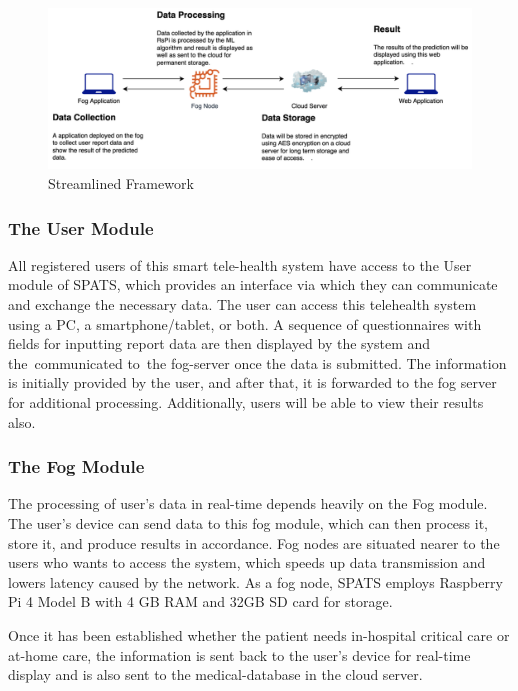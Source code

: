 \documentclass[10pt]{article}
\begin{document}
\begin{figure}[H]
    \begin{center}
        \includegraphics[width=0.9\linewidth,frame]{CA2-template/RIC18.png}
        \caption{Streamlined Framework\label{fig:4.1}}
    \end{center}
\end{figure}

\subsubsection{The User Module}
All registered users of this smart tele-health system have access to the User module of SPATS, which provides an interface via which they can communicate and exchange the necessary data. The user can access this telehealth system using a PC, a smartphone/tablet, or both. A sequence of questionnaires with fields for inputting report data are then displayed by the system and the communicated to the fog-server once the data is submitted. The information is initially provided by the user, and after that, it is forwarded to the fog server for additional processing. Additionally, users will be able to view their results also.

\subsubsection{The Fog Module}
The processing of user's data in real-time depends heavily on the Fog module. The user's device can send data to this fog module, which can then process it, store it, and produce results in accordance. Fog nodes are situated nearer to the users who wants to access the system, which speeds up data transmission and lowers latency caused by the network. 
As a fog node, SPATS employs Raspberry Pi 4 Model B with 4 GB RAM and 32GB SD card for storage.

Once it has been established whether the patient needs in-hospital critical care or at-home care, the information is sent back to the user's device for real-time display and is also sent to the medical-database in the cloud server. 
\end{document}

